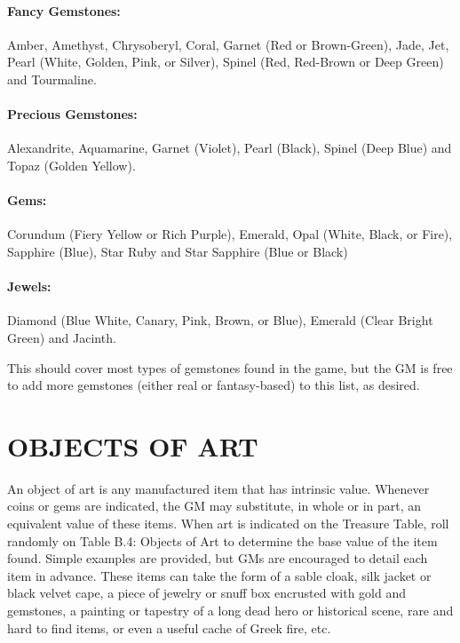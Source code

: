 \begin{multicols}{2}
\paragraph{Fancy Gemstones:} Amber, Amethyst, Chrysoberyl, Coral, Garnet (Red or Brown-Green), Jade, Jet, Pearl (White, Golden, Pink, or Silver), Spinel (Red, Red-Brown or Deep Green) and Tourmaline.

\paragraph{Precious Gemstones:} Alexandrite, Aquamarine, Garnet (Violet), Pearl (Black), Spinel (Deep Blue) and Topaz (Golden Yellow).

\paragraph{Gems:} Corundum (Fiery Yellow or Rich Purple), Emerald, Opal (White, Black, or Fire), Sapphire (Blue), Star Ruby and Star Sapphire (Blue or Black)

\paragraph{Jewels:} Diamond (Blue White, Canary, Pink, Brown, or Blue), Emerald (Clear Bright Green) and Jacinth.

This should cover most types of gemstones found in the game, but the GM is free to add more gemstones (either real or fantasy-based) to this list, as desired.

\section{OBJECTS OF ART}

An object of art is any manufactured item that has intrinsic value.  Whenever coins or gems are indicated, the GM may substitute, in whole or in part, an equivalent value of these items.  When art is indicated on the Treasure Table, roll randomly on Table B.4: Objects of Art to determine the base value of the item found.  Simple examples are provided, but GMs are encouraged to detail each item in advance.  These items can take the form of a sable cloak, silk jacket or black velvet cape, a piece of jewelry or snuff box encrusted with gold and gemstones, a painting or tapestry of a long dead hero or historical scene, rare and hard to find items, or even a useful cache of Greek fire, etc. 

\noindent
\begin{minipage}{\columnwidth}


\end{minipage}
\end{multicols}
